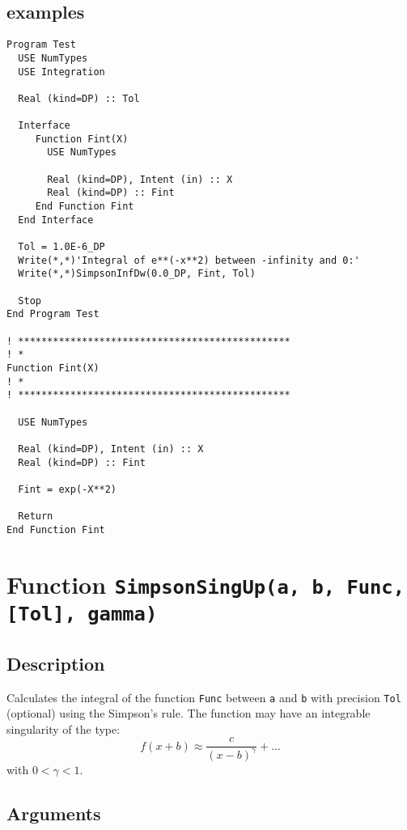 \subsection{examples}

\begin{verbatim}
Program Test
  USE NumTypes
  USE Integration

  Real (kind=DP) :: Tol

  Interface 
     Function Fint(X)
       USE NumTypes

       Real (kind=DP), Intent (in) :: X
       Real (kind=DP) :: Fint
     End Function Fint
  End Interface

  Tol = 1.0E-6_DP
  Write(*,*)'Integral of e**(-x**2) between -infinity and 0:'
  Write(*,*)SimpsonInfDw(0.0_DP, Fint, Tol)

  Stop
End Program Test

! ***********************************************
! *
Function Fint(X)
! *  
! ***********************************************

  USE NumTypes

  Real (kind=DP), Intent (in) :: X
  Real (kind=DP) :: Fint

  Fint = exp(-X**2)

  Return
End Function Fint
\end{verbatim}

\section{Function \texttt{SimpsonSingUp(a, b, Func, [Tol], gamma)}}

\subsection{Description}

Calculates the integral of the function \texttt{Func} between
\texttt{a} and \texttt{b} with precision \texttt{Tol} (optional) using
the Simpson's rule. The function may have an integrable singularity of
the type:
\begin{displaymath}
  f(x+b) \approx \frac{c}{(x-b)^\gamma} +  \dots
\end{displaymath}
with $0<\gamma<1$.

\subsection{Arguments}

